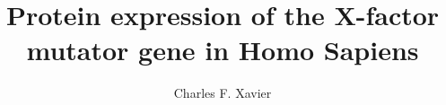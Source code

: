 \documentclass[10pt,a4paper,twoside,openany,final]{oxengthesis}
\title      {Protein expression of the X-factor mutator gene in Homo Sapiens}
\author     {Charles F. Xavier}
\begin{document}
\frontmatter


\makefrontmatterpages

\mainmatter









\appendix




\backmatter 

\listofreferences
\end{document}
